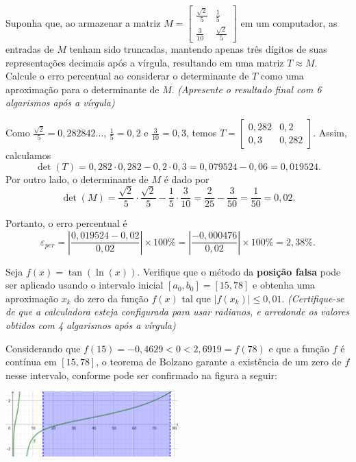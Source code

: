 \documentclass[12pt,a4paper]{article}
\begin{document}
\begin{ExerciseList}
\Exercise[title={2,5}] Suponha que, ao armazenar a matriz
\(M = \begin{bmatrix}
    \frac{\sqrt{2}}{5} & \frac{1}{5}\\
    \frac{3}{10}        & \frac{\sqrt{2}}{5}
\end{bmatrix}\)
em um computador, as entradas de \(M\) tenham sido truncadas, mantendo apenas três dígitos de suas representações decimais após a vírgula, resultando em uma matriz \(T \approx M\). Calcule o erro percentual ao considerar o determinante de \(T\) como uma aproximação para o determinante de \(M\).
{\color{blue} \textit{(Apresente o resultado final com 6 algarismos após a vírgula)}}

\Answer Como \(\frac{\sqrt{2}}{5} = 0,282842\ldots\), \(\frac{1}{5} = 0,2\) e \(\frac{3}{10} = 0,3\), temos
\(T = \begin{bmatrix}
    0,282 & 0,2\\
    0,3   & 0,282
\end{bmatrix}\).
Assim, calculamos
\[
\det(T) = 0,282 \cdot 0,282 - 0,2 \cdot 0,3 = 0,079524 - 0,06 = 0,019524.
\]
Por outro lado, o determinante de \(M\) é dado por
\[
\det(M) = \frac{\sqrt{2}}{5} \cdot \frac{\sqrt{2}}{5} - \frac{1}{5} \cdot \frac{3}{10} = \frac{2}{25} - \frac{3}{50} = \frac{1}{50} = 0,02.
\]

Portanto, o erro percentual é
\[
\varepsilon_{per} = \left|\frac{0,019524 - 0,02}{0,02}\right| \times 100\% = \left|\frac{-0,000476}{0,02}\right| \times 100\% = 2,38\%.
\]


\Exercise[title={2,5}] Seja \(f(x) = \tan(\ln(x))\). Verifique que o método da \textbf{posição falsa} pode ser aplicado usando o intervalo inicial \([a_0, b_0] = [15, 78]\) e obtenha uma aproximação \(x_k\) do zero da função \(f(x)\) tal que \(|f(x_k)| \leq 0,01\). {\color{blue} \textit{(Certifique-se de que a calculadora esteja configurada para usar radianos, e arredonde os valores obtidos com 4 algarismos após a vírgula)}}

\Answer Considerando que \(f(15) = -0,4629 < 0 < 2,6919 = f(78)\) e que a função \(f\) é contínua em \([15, 78]\), o teorema de Bolzano garante a existência de um zero de \(f\) nesse intervalo, conforme pode ser confirmado na figura a seguir:

\begin{center}
\includegraphics[width=0.5\textwidth]{img/posição-falsa.pdf}
\end{center}


\end{ExerciseList}
\end{document}
